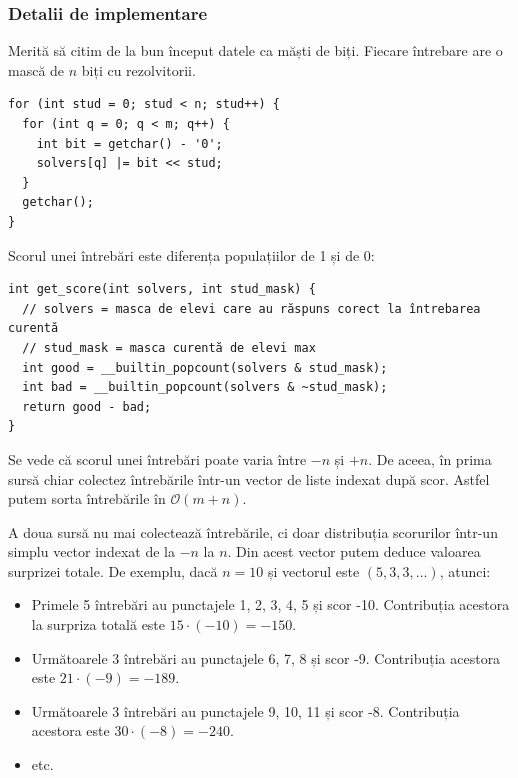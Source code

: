 \subsubsection*{Detalii de implementare}

Merită să citim de la bun început datele ca măști de biți. Fiecare întrebare are o mască de $n$ biți cu rezolvitorii.

\begin{verbatim}
for (int stud = 0; stud < n; stud++) {
  for (int q = 0; q < m; q++) {
    int bit = getchar() - '0';
    solvers[q] |= bit << stud;
  }
  getchar();
}
\end{verbatim}

Scorul unei întrebări este diferența populațiilor de 1 și de 0:

\begin{verbatim}
int get_score(int solvers, int stud_mask) {
  // solvers = masca de elevi care au răspuns corect la întrebarea curentă
  // stud_mask = masca curentă de elevi max
  int good = __builtin_popcount(solvers & stud_mask);
  int bad = __builtin_popcount(solvers & ~stud_mask);
  return good - bad;
}
\end{verbatim}

Se vede că scorul unei întrebări poate varia între $-n$ și $+n$. De aceea, în prima sursă chiar colectez întrebările într-un vector de liste indexat după scor. Astfel putem sorta întrebările în $\mathcal{O}(m + n)$.

A doua sursă nu mai colectează întrebările, ci doar distribuția scorurilor într-un simplu vector indexat de la $-n$ la $n$. Din acest vector putem deduce valoarea surprizei totale. De exemplu, dacă $n=10$ și vectorul este $(5, 3, 3, \dots)$, atunci:

\begin{itemize}
  \item Primele 5 întrebări au punctajele 1, 2, 3, 4, 5 și scor -10. Contribuția acestora la surpriza totală este $15 \cdot (-10) = -150$.

  \item Următoarele 3 întrebări au punctajele 6, 7, 8 și scor -9. Contribuția acestora este $21 \cdot (-9) = -189$.

  \item Următoarele 3 întrebări au punctajele 9, 10, 11 și scor -8. Contribuția acestora este $30 \cdot (-8) = -240$.

  \item etc.
\end{itemize}

